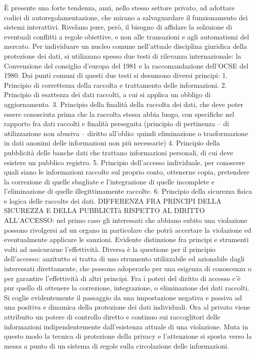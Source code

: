 È presente una forte tendenza, anzi, nello stesso settore privato, ad adottare codici di autoregolamentazione, che mirano a salvaguardare il funzionamento dei sistemi interattivi. Rivelano pure, però, il bisogno di affidare la solzuione di eventuali conflitti a regole obiettive, e non alle transazioni e agli automatismi del mercato.
Per individuare un nucleo comune nell’attuale disciplina giuridica della protezione dei dati, si utilizzano spesso due testi di rilevanza internazionale: la Convenzione del consiglio d’europa del 1981 e la raccomandazione dell’OCSE del 1980. Dai punti comuni di questi due testi si desumono diversi principi:
1.	Principio di correttezza della raccolta e trattamento delle informazioni.
2.	Principio di esattezza dei dati raccolti, a cui si applica un obbligo di aggiornamento.
3.	Principio della finalità della raccolta dei dati, che deve poter essere conosciuta prima che la raccolta stessa abbia luogo, con specifiche nel rapporto fra dati raccolti e finalità perseguita (principio di pertinenza – di utilizzazione non abusiva – diritto all’oblio: quindi eliminazione o trasformazione in dati anonimi delle informazioni non più necessarie)
4.	Principio della pubblicità delle banche dati che trattano informazioni personali, di cui deve esistere un pubblico registro.
5.	Principio dell’accesso individuale, per conoscere quali siano le informazioni raccolte sul proprio conto, ottenerne copia, pretendere la correzione di quelle sbagliate e l’integrazione di quelle incomplete e l’eliminazione di quelle illegittimamente raccolte.
6.	Principio della sicurezza fisica e logica delle raccolte dei dati.
DIFFERENZA FRA PRINCIPI DELLA SICUREZZA E DELLA PUBBLICITà RISPETTO AL DIRITTO ALL’ACCESSO:
nel primo caso gli interessati che abbiano subito una violazione possono rivolgersi ad un organo in particolare che potrà accertare la violazione ed eventualmente applicare le sanzioni. Evidente distinzione fra principi e strumenti volti ad assicurarne l’effettività. Diversa è la questione per il principio dell’accesso: anzitutto si tratta di uno strumento utilizzabile ed azionabile dagli interessati direttamente, che possono adoperarlo per una esigenza di conoscenza o per garantire l’effettività di altri principi. Fra i poteri del diritto di accesso c’è pur quello di ottenere la correzione, integrazione, o eliminazione dei dati raccolti. 
Si coglie evidentemente il passaggio da una impostazione negativa e passiva ad una positiva e dinamica della protezione dei dati individuali. Ora al privato viene attribuito un potere di controllo diretto e continuo sui raccoglitori delle informazioni indipendentemente dall’esistenza attuale di una violazione. Muta in questo modo la tecnica di protezione della privacy e l’attenzione si sposta verso la messa a punto di un sistema di regole sulla circolazione delle informazioni. 

